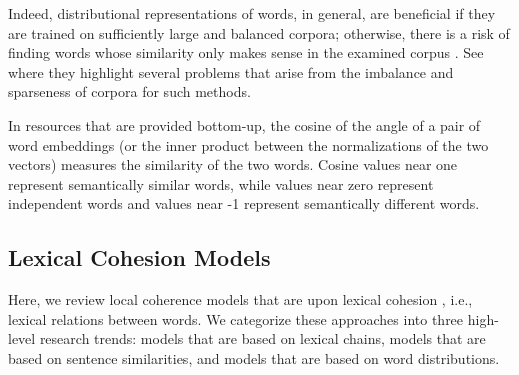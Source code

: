 Indeed, distributional representations of words, in general, are beneficial if they are trained on sufficiently large and balanced corpora; otherwise, there is a risk of finding words whose similarity only makes sense in the examined corpus \cite{lindekang98b}.  
See  where they highlight several problems that arise from the imbalance and sparseness of corpora for such methods. 

In resources that are provided bottom-up, the cosine of the angle of a pair of word embeddings (or the inner product between the normalizations of the two vectors) measures the similarity of the two words. 
Cosine values near one represent semantically similar words, while values near zero represent independent words and values near -1 represent semantically different words. 

\subsection{Lexical Cohesion Models}

Here, we review local coherence models that are upon lexical cohesion \cite{halliday76}, i.e., lexical relations between words. 
We categorize these approaches into three high-level research trends: models that are based on lexical chains,  models that are based on sentence similarities, and models that are based on word distributions.  

